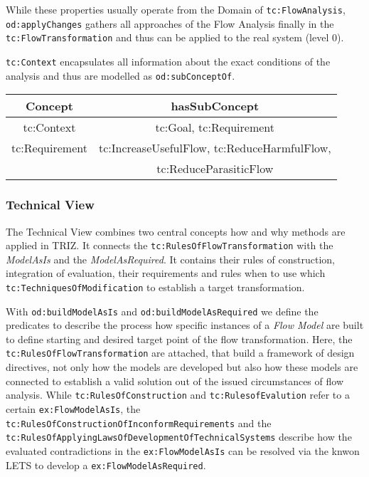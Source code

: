 \documentclass[a4paper,11pt]{article}
\begin{document}
While these properties usually operate from the Domain of
\texttt{tc:FlowAnalysis}, \texttt{od:apply\-Changes} gathers all approaches of
the Flow Analysis finally in the \texttt{tc:FlowTransformation} and thus can
be applied to the real system (level 0).

\texttt{tc:Context} encapsulates all information about the exact conditions
of the analysis and thus are modelled as \texttt{od:subConceptOf}.

\begin{center}
\begin{tabular}{|c|c|}\hline
Concept & hasSubConcept \\\hline
tc:Context & tc:Goal, tc:Requirement \\
tc:Requirement & tc:IncreaseUsefulFlow, tc:ReduceHarmfulFlow, \\
& tc:ReduceParasiticFlow \\\hline 
\end{tabular}
\end{center}

\subsubsection{Technical View}
The Technical View combines two central concepts how and why methods are
applied in TRIZ. It connects the \texttt{tc:RulesOfFlowTransformation} with
the \emph{ModelAsIs} and the \emph{ModelAsRequired}. It contains their rules
of construction, integration of evaluation, their requirements and rules when
to use which \texttt{tc:TechniquesOfModification} to establish a target
transformation.

With \texttt{od:buildModelAsIs} and \texttt{od:buildModelAsRequired} we define
the predicates to describe the process how specific instances of a \emph{Flow
  Model} are built to define starting and desired target point of the flow
transformation.  Here, the \texttt{tc:RulesOfFlowTransformation} are attached,
that build a framework of design directives, not only how the models are
developed but also how these models are connected to establish a valid
solution out of the issued circumstances of flow analysis. While
\texttt{tc:RulesOfConstruction} and \texttt{tc:RulesofEvalution} refer to a
certain \texttt{ex:FlowModelAsIs}, the
\texttt{tc:RulesOfConstructionOfInconformRequirements} and the
\texttt{tc:RulesOfApplyingLawsOfDevelopmentOfTechnicalSystems} describe how
the evaluated contradictions in the \texttt{ex:FlowModelAsIs} can be resolved
via the knwon LETS to develop a \texttt{ex:FlowModelAsRequired}.
\end{document}
